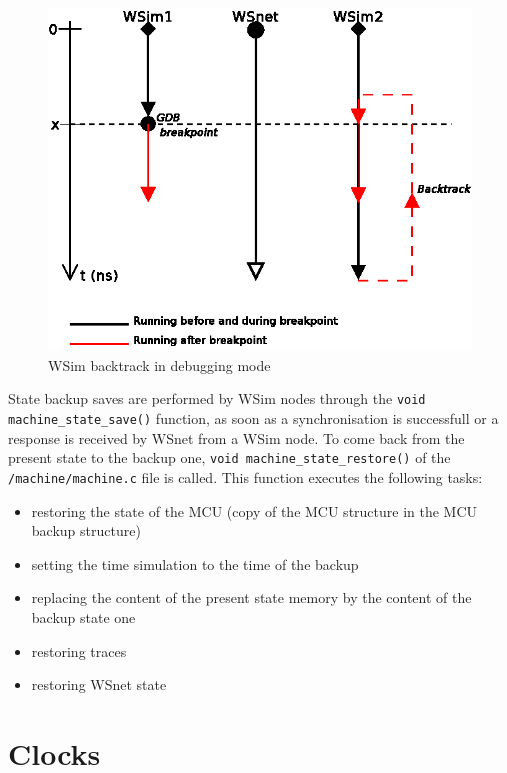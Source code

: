 \documentclass[a4paper,10pt]{report}
\begin{document}
\begin{figure}
\begin{center}
  \includegraphics[scale=1]{figures/wsim_backtrack2.eps}
\end{center}
\caption{WSim backtrack in debugging mode}
\label{wsim backtrack 2}
\end{figure}

State backup saves are performed by WSim nodes through the
\verb$void machine_state_save()$ function, as soon as a
synchronisation is successfull or a response is received by WSnet from
a WSim node. To come back from the present state to the backup one,
\verb$void machine_state_restore()$ of the \verb$/machine/machine.c$
file is called. This function executes the following tasks:

\begin{itemize}
\item restoring the state of the MCU (copy of the MCU structure in the
  MCU backup structure)
\item setting the time simulation to the time of the backup
\item replacing the content of the present state memory by the content
  of the backup state one
\item restoring traces
\item restoring WSnet state
\end{itemize}


\section{Clocks}
\end{document}
